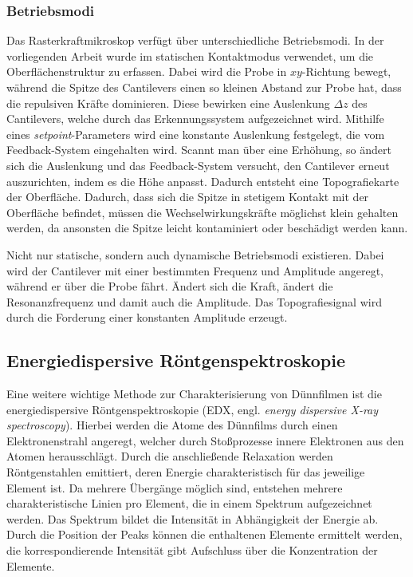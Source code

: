 \subsubsection{Betriebsmodi}
Das Rasterkraftmikroskop verfügt über unterschiedliche Betriebsmodi.
In der vorliegenden Arbeit wurde im statischen Kontaktmodus verwendet, um die Oberflächenstruktur zu erfassen.
Dabei wird die Probe in $xy$-Richtung bewegt, während die Spitze des Cantilevers einen so kleinen Abstand zur Probe hat,
dass die repulsiven Kräfte dominieren.
Diese bewirken eine Auslenkung $\Delta z$ des Cantilevers, welche durch das Erkennungssystem aufgezeichnet wird.
Mithilfe eines \textit{setpoint}-Parameters wird eine konstante Auslenkung festgelegt, die vom Feedback-System
eingehalten wird.
Scannt man über eine Erhöhung, so ändert sich die Auslenkung und das Feedback-System versucht, den Cantilever erneut
auszurichten, indem es die Höhe anpasst.
Dadurch entsteht eine Topografiekarte der Oberfläche.
Dadurch, dass sich die Spitze in stetigem Kontakt mit der Oberfläche befindet, müssen die Wechselwirkungskräfte
möglichst klein gehalten werden,
da ansonsten die Spitze leicht kontaminiert oder beschädigt werden kann.\autocite[199-201]{afm-buch}

Nicht nur statische, sondern auch dynamische Betriebsmodi existieren.
Dabei wird der Cantilever mit einer bestimmten Frequenz und Amplitude angeregt, während er über die Probe fährt.
Ändert sich die Kraft, ändert die Resonanzfrequenz und damit auch die Amplitude.
Das Topografiesignal wird durch die Forderung einer konstanten Amplitude erzeugt.\autocite[209]{afm-buch}

\subsection{Energiedispersive Röntgenspektroskopie}\label{sec:energiedispersive-rontgenspektroskopie}
Eine weitere wichtige Methode zur Charakterisierung von Dünnfilmen ist die energiedispersive Röntgenspektroskopie
(EDX, engl. \textit{energy dispersive X-ray spectroscopy}).
Hierbei werden die Atome des Dünnfilms durch einen Elektronenstrahl angeregt, welcher durch Stoßprozesse innere
Elektronen aus den Atomen herausschlägt.
Durch die anschließende Relaxation werden Röntgenstahlen emittiert, deren Energie charakteristisch für das jeweilige
Element ist.
Da mehrere Übergänge möglich sind, entstehen mehrere charakteristische Linien pro Element, die in einem Spektrum
aufgezeichnet werden.
Das Spektrum bildet die Intensität in Abhängigkeit der Energie ab.
Durch die Position der Peaks können die enthaltenen Elemente ermittelt werden,
die korrespondierende Intensität gibt Aufschluss über die Konzentration der Elemente.
\autocite[7-11]{edx}


